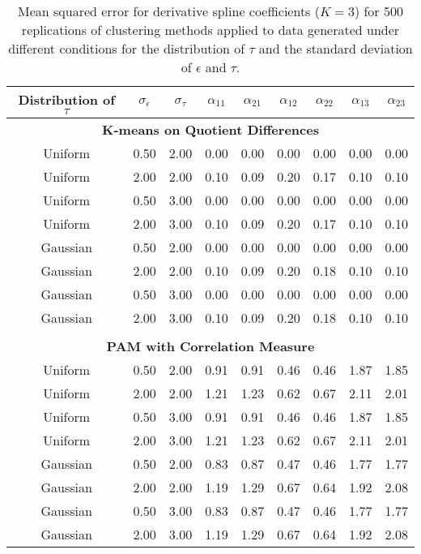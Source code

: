 \begin{table}[ht]
\begin{center}
\begin{tabular}{ccc|cccccc}
  \hline Distribution of $\tau$&$\sigma_{\epsilon}$&$\sigma_{\tau}$&$\alpha_{11}$&$\alpha_{21}$&$\alpha_{12}$&$\alpha_{22}$&$\alpha_{13}$&$\alpha_{23}$\\  \hline\multicolumn{9}{c}{\textbf{K-means on Quotient Differences}}\\ Uniform & 0.50 & 2.00 & 0.00 & 0.00 & 0.00 & 0.00 & 0.00 & 0.00 \\ 
  Uniform & 2.00 & 2.00 & 0.10 & 0.09 & 0.20 & 0.17 & 0.10 & 0.10 \\ 
  Uniform & 0.50 & 3.00 & 0.00 & 0.00 & 0.00 & 0.00 & 0.00 & 0.00 \\ 
  Uniform & 2.00 & 3.00 & 0.10 & 0.09 & 0.20 & 0.17 & 0.10 & 0.10 \\ 
  Gaussian & 0.50 & 2.00 & 0.00 & 0.00 & 0.00 & 0.00 & 0.00 & 0.00 \\ 
  Gaussian & 2.00 & 2.00 & 0.10 & 0.09 & 0.20 & 0.18 & 0.10 & 0.10 \\ 
  Gaussian & 0.50 & 3.00 & 0.00 & 0.00 & 0.00 & 0.00 & 0.00 & 0.00 \\ 
  Gaussian & 2.00 & 3.00 & 0.10 & 0.09 & 0.20 & 0.18 & 0.10 & 0.10 \\ 
   \\ \multicolumn{9}{c}{\textbf{PAM with Correlation Measure}}\\Uniform & 0.50 & 2.00 & 0.91 & 0.91 & 0.46 & 0.46 & 1.87 & 1.85 \\ 
  Uniform & 2.00 & 2.00 & 1.21 & 1.23 & 0.62 & 0.67 & 2.11 & 2.01 \\ 
  Uniform & 0.50 & 3.00 & 0.91 & 0.91 & 0.46 & 0.46 & 1.87 & 1.85 \\ 
  Uniform & 2.00 & 3.00 & 1.21 & 1.23 & 0.62 & 0.67 & 2.11 & 2.01 \\ 
  Gaussian & 0.50 & 2.00 & 0.83 & 0.87 & 0.47 & 0.46 & 1.77 & 1.77 \\ 
  Gaussian & 2.00 & 2.00 & 1.19 & 1.29 & 0.67 & 0.64 & 1.92 & 2.08 \\ 
  Gaussian & 0.50 & 3.00 & 0.83 & 0.87 & 0.47 & 0.46 & 1.77 & 1.77 \\ 
  Gaussian & 2.00 & 3.00 & 1.19 & 1.29 & 0.67 & 0.64 & 1.92 & 2.08 \\ 
   \hline\end{tabular}
\caption{Mean squared error for derivative spline coefficients ($K=3$) for 500 replications of clustering methods applied to data generated under different conditions for the distribution of $\tau$ and the standard deviation of $\epsilon$ and $\tau$.}
\label{tab:mse2}
\end{center}
\end{table}

